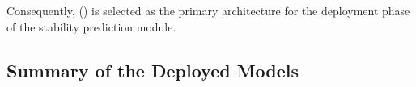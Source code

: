 Consequently, \textbf{\StabSelMethod{}} (\texttt{\StabSelConfig}) is selected as the primary
architecture for the deployment phase of the stability prediction module.

\subsection*{Summary of the Deployed Models}



